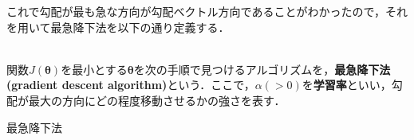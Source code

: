これで勾配が最も急な方向が勾配ベクトル方向であることがわかったので，それを用いて最急降下法を以下の通り定義する．
\begin{defi}[最急降下法]
　\\
関数$J({\bm \theta})$を最小とする${\bm \theta}$を次の手順で見つけるアルゴリズムを，{\bf 最急降下法(gradient descent algorithm)}という．ここで，$\alpha (>0)$を{\bf 学習率}といい，勾配が最大の方向にどの程度移動させるかの強さを表す．
\begin{algorithm}[H]
\caption{最急降下法}
\begin{algorithmic}[1]

\EndWhile
\end{algorithmic}
\end{algorithm}
\end{defi}

